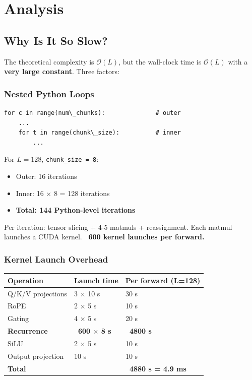 
\section{Analysis}

\subsection{Why Is It So Slow?}

The theoretical complexity is $\mathcal{O}(L)$, but the wall-clock time is 
$\mathcal{O}(L)$ with a \textbf{very large constant}. Three factors:

\subsubsection{Nested Python Loops}

\begin{lstlisting}
for c in range(num\_chunks):              # outer
    ...
    for t in range(chunk\_size):          # inner
        ...
\end{lstlisting}

For $L = 128$, \texttt{chunk\_size = 8}:
\begin{itemize}
\item Outer: 16 iterations
\item Inner: 16 $\times$ 8 = 128 iterations
\item \textbf{Total: 144 Python-level iterations}

\end{itemize}
Per iteration: tensor slicing + 4-5 matmuls + reassignment. Each matmul 
launches a CUDA kernel. \textbf{~600 kernel launches per forward.}

\subsubsection{Kernel Launch Overhead}

\begin{table}[H]
\centering
\small
\begin{tabular}{lll}
\toprule
\textbf{Operation} & \textbf{Launch time} & \textbf{Per forward (L=128)} \\
\midrule
Q/K/V projections & 3 $\times$ 10  s & 30  s \\
RoPE & 2 $\times$ 5  s & 10  s \\
Gating & 4 $\times$ 5  s & 20  s \\
\textbf{Recurrence} & \textbf{~600 $\times$ 8  s} & \textbf{~4800  s} \\
SiLU & 2 $\times$ 5  s & 10  s \\
Output projection & 10  s & 10  s \\
\textbf{Total} &  & \textbf{~4880  s = 4.9 ms} \\
\bottomrule
\end{tabular}
\end{table}

